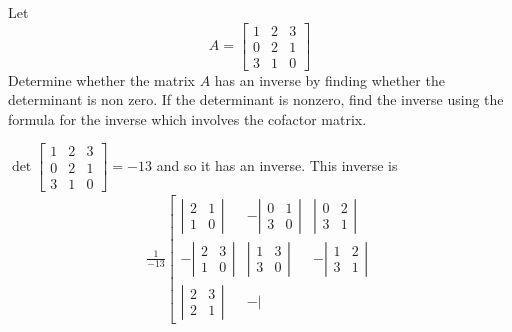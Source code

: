\documentclass{ximera}
\begin{document}
\begin{problem}\label{prb:7.26} Let
\begin{equation*}
A=
\left[
\begin{array}{rrr}
1 & 2 & 3 \\
0 & 2 & 1 \\
3 & 1 & 0
\end{array}
\right]
\end{equation*}
Determine whether the matrix $A$ has an inverse by finding whether the
determinant is non zero. If the determinant is nonzero, find the inverse
using the formula for the inverse which involves the cofactor matrix.
\begin{hint}
$\det
\left[
\begin{array}{ccc}
1 & 2 & 3 \\
0 & 2 & 1 \\
3 & 1 & 0
\end{array}
\right] = -13$ and so it has an inverse. This inverse is
\begin{eqnarray*}
\frac{1}{-13}\left[
\begin{array}{rrr}
\left\vert
\begin{array}{cc}
2 & 1 \\
1 & 0
\end{array}
\right\vert  & -\left\vert
\begin{array}{cc}
0 & 1 \\
3 & 0
\end{array}
\right\vert  & \left\vert
\begin{array}{cc}
0 & 2 \\
3 & 1
\end{array}
\right\vert  \\
-\left\vert
\begin{array}{cc}
2 & 3 \\
1 & 0
\end{array}
\right\vert  & \left\vert
\begin{array}{cc}
1 & 3 \\
3 & 0
\end{array}
\right\vert  & -\left\vert
\begin{array}{cc}
1 & 2 \\
3 & 1
\end{array}
\right\vert  \\
\left\vert
\begin{array}{cc}
2 & 3 \\
2 & 1
\end{array}
\right\vert  & -\left\vert
\begin{array}{cc}

\end{array}
\end{array}
\end{eqnarray*}
\end{hint}
\end{problem}
\end{document}
